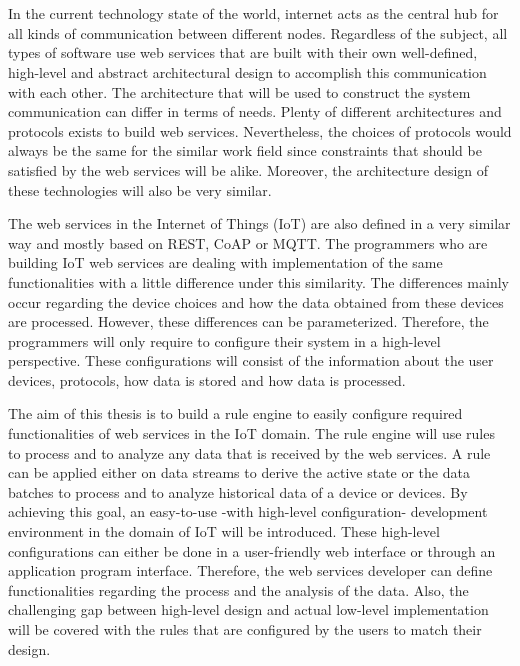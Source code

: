 \chapter{\abstractname}


In the current technology state of the world, internet acts as the central hub for all kinds of communication between different nodes. Regardless of the subject, all types of software use web services that are built with their own well-defined, high-level and abstract architectural design to accomplish this communication with each other. The architecture that will be used to construct the system communication can differ in terms of needs. Plenty of different architectures and protocols exists to build web services. Nevertheless, the choices of protocols would always be the same for the similar work field since constraints that should be satisfied by the web services will be alike. Moreover, the architecture design of these technologies will also be very similar.

The web services in the Internet of Things (IoT) are also defined in a very similar way and mostly based on REST, CoAP or MQTT. The programmers who are building IoT web services are dealing with implementation of the same functionalities with a little difference under this similarity. The differences mainly occur regarding the device choices and how the data obtained from these devices are processed. However, these differences can be parameterized. Therefore, the programmers will only require to configure their system in a high-level perspective. These configurations will consist of the information about the user devices,  protocols, how data is stored and how data is processed.

The aim of this thesis is to build a rule engine to easily configure required functionalities of web services in the IoT domain. The rule engine will use rules to process and to analyze any data that is received by the web services. A rule can be applied either on data streams to derive the active state or the data batches to process and to analyze historical data of a device or devices. By achieving this goal, an easy-to-use -with high-level configuration- development environment in the domain of IoT will be introduced. These high-level configurations can either be done in a user-friendly web interface or through an application program interface. Therefore, the web services developer can define functionalities regarding the process and the analysis of the data. Also, the challenging gap between high-level design and actual low-level implementation will be covered with the rules that are configured by the users to match their design.

